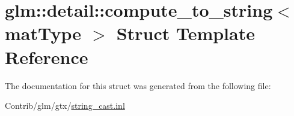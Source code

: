 \hypertarget{structglm_1_1detail_1_1compute__to__string}{}\section{glm\+:\+:detail\+:\+:compute\+\_\+to\+\_\+string$<$ mat\+Type $>$ Struct Template Reference}
\label{structglm_1_1detail_1_1compute__to__string}


The documentation for this struct was generated from the following file\+:\begin{DoxyCompactItemize}
\item 
Contrib/glm/gtx/\mbox{\hyperlink{string__cast_8inl}{string\+\_\+cast.\+inl}}\end{DoxyCompactItemize}

